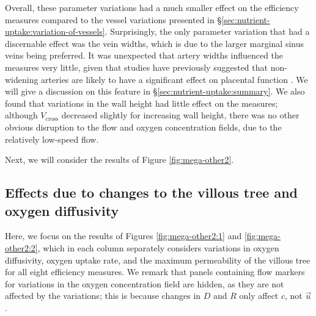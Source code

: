             Overall, these parameter variations had a much smaller effect on the efficiency measures compared to the vessel variations presented in \S\ref{sec:nutrient-uptake:variation-of-vessels}. Surprisingly, the only parameter variation that had a discernable effect was the vein widths, which is due to the larger marginal sinus veins being preferred. It was unexpected that artery widths influenced the measures very little, given that studies have previously suggested that non-widening arteries are likely to have a significant effect on placental function \cite{burtonRheologicalPhysiologicalConsequences2009}. We will give a discussion on this feature in \S\ref{sec:nutrient-uptake:summary}. We also found that variations in the wall height had little effect on the measures; although $V_\text{cross}$ decreased slightly for increasing wall height, there was no other obvious disruption to the flow and oxygen concentration fields, due to the relatively low-speed flow.

            Next, we will consider the results of Figure \ref{fig:mega-other2}.

        \subsection{Effects due to changes to the villous tree and oxygen diffusivity} \label{sec:nutrient-uptake:variation-of-other-parameters:2}
            Here, we focus on the results of Figures \ref{fig:mega-other2:1} and \ref{fig:mega-other2:2}, which in each column separately considers variations in oxygen diffusivity, oxygen uptake rate, and the maximum permeability of the villous tree for all eight efficiency measures. We remark that panels containing flow markers for variations in the oxygen concentration field are hidden, as they are not affected by the variations; this is because changes in $D$ and $R$ only affect $c$, not $\vec{u}$.

